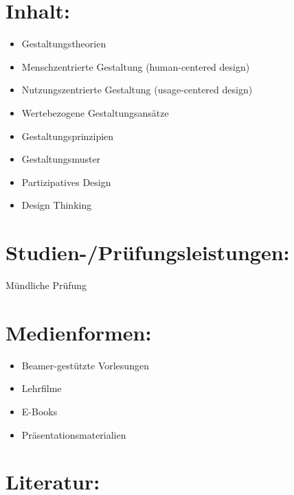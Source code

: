 \section*{Inhalt:}\label{inhalt-4}

\begin{itemize}
\tightlist
\item
  Gestaltungstheorien
\item
  Menschzentrierte Gestaltung (human-centered design)
\item
  Nutzungszentrierte Gestaltung (usage-centered design)
\item
  Wertebezogene Gestaltungsansätze
\item
  Gestaltungsprinzipien
\item
  Gestaltungsmuster
\item
  Partizipatives Design
\item
  Design Thinking
\end{itemize}

\section*{Studien-/Prüfungsleistungen:}\label{studien-pruxfcfungsleistungen-4}

Mündliche Prüfung

\section*{Medienformen:}\label{medienformen-4}

\begin{itemize}
\tightlist
\item
  Beamer-gestützte Vorlesungen
\item
  Lehrfilme
\item
  E-Books
\item
  Präsentationsmaterialien
\end{itemize}

\section*{Literatur:}\label{literatur-4}

